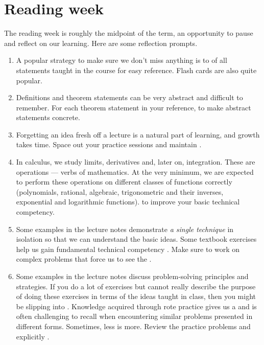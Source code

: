 \documentclass[../main.tex]{subfiles}
\begin{document}
 \section{Reading week}
The reading week is roughly the midpoint of the term, an opportunity to pause and reflect on our learning. Here are some reflection prompts.

\begin{enumerate}
  \item {} A popular strategy to make sure we don't miss anything is to  of all statements taught in the course for easy reference. Flash cards are also quite popular.

  \item {} Definitions and theorem statements can be very abstract and difficult to remember. For each theorem statement in your reference,  to make abstract statements concrete.

  \item {} Forgetting an idea fresh off a lecture is a natural part of learning, and growth takes time. Space out your practice sessions and maintain .

  \item {} In calculus, we study limits, derivatives and, later on, integration. These are operations --- verbs of mathematics. At the very minimum, we are expected to perform these operations on different classes of functions correctly (polynomials, rational, algebraic, trigonometric and their inverses, exponential and logarithmic functions).  to improve your basic technical competency.

  \item {} Some examples in the lecture notes demonstrate \emph{a single technique} in isolation so that we can understand the basic ideas. Some textbook exercises help us gain fundamental technical competency . Make sure to work on complex problems that force us to see the .

  \item {} Some examples in the lecture notes discuss problem-solving principles and strategies. If you do a lot of exercises but cannot really describe the purpose of doing these exercises in terms of the ideas taught in class, then you might be slipping into . Knowledge acquired through rote practice gives us a  and is often challenging to recall when encountering similar problems presented in different forms. Sometimes, less is more. Review the practice problems and explicitly . 


\end{enumerate}
\end{document}
